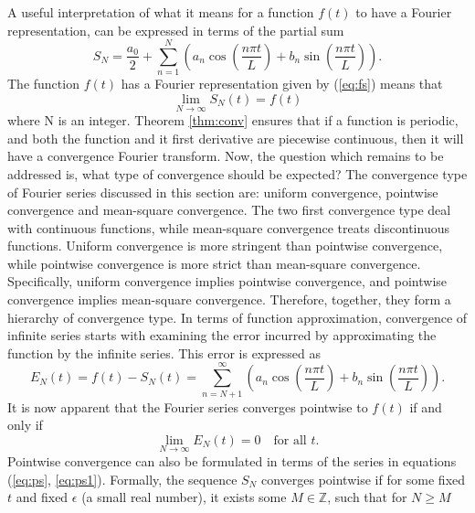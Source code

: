 \documentclass[../Main/thesis.tex]{subfiles}
\begin{document}
A useful interpretation of what it means for a function $f(t)$ to have a Fourier representation, can be expressed in terms of the partial sum
\begin{equation}\label{eq:ps}
	S_{N} = \frac{a_{0}}{2} +\sum_{n=1}^{N}\left( a_{n} \cos\left( \frac{n\pi t}{L}\right) + b_{n} \sin\left( \frac{n\pi t}{L}\right)  \right).
\end{equation}\label{eq:ps1}
The function $f(t)$ has a Fourier representation given by (\ref{eq:fs}) means that 
\begin{equation}\label{eq:ps1}
\lim_{N\rightarrow\infty}S_{N}(t)= f(t)
\end{equation}
where N is an integer. 
\justify
Theorem \ref{thm:conv} ensures that if a function is periodic, and both the function and it first derivative are piecewise continuous, then it will have a convergence Fourier transform. Now, the question which remains to be addressed is, what type of convergence should be expected? The convergence type of Fourier series discussed in this section are: uniform convergence, pointwise convergence and mean-square convergence. The two first convergence type deal with continuous functions, while mean-square convergence treats discontinuous functions. 
\justify
Uniform convergence is more stringent than pointwise convergence, while pointwise convergence is more strict than mean-square convergence. Specifically, uniform convergence implies pointwise convergence, and pointwise convergence implies mean-square convergence. Therefore, together, they form a hierarchy of convergence type. 
\justify
In terms of function approximation, convergence of infinite series starts with examining the error incurred by approximating the function by the infinite series. This error is expressed as 
\begin{equation}\label{eq:error}
E_{N}(t) = f(t)-S_{N}(t) = \sum_{n=N+1}^{\infty}\left( a_{n} \cos\left( \frac{n\pi t}{L}\right) + b_{n} \sin\left( \frac{n\pi t}{L}\right)  \right).
\end{equation} 
It is now apparent that the Fourier series converges pointwise to $f(t)$ if and only if 
\begin{equation}
\lim_{N\rightarrow\infty}E_{N}(t)= 0\quad \text{for all $t$}.
\end{equation}
Pointwise convergence can also be formulated in terms of the series in equations (\ref{eq:ps}, \ref{eq:ps1}). Formally, the sequence $S_{N}$ converges pointwise if for some fixed $t$ and fixed $\epsilon$ (a small real number), it exists some $M\in \mathbb{Z}$, such that for $N\geq M$
\end{document}
